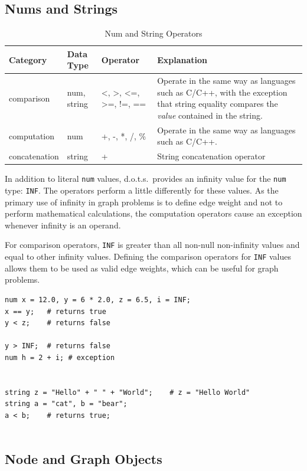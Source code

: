 \documentclass{article}
\newcommand{\pltlang}{d.o.t.s.} %
\newcommand{\code}[1]{\texttt{#1}} %
\begin{document}
\subsection{Nums and Strings}

\begin{table}[H]
\centering
\begin{tabular}{| p{.8in} | p{1in} | p{1.5in} | p{2.5in} | }
\hline
Category & Data Type & Operator & Explanation \\
\hline
comparison & num, string & <, >, <=, >=, !=, == & Operate in the same way as languages such as C/C++, with the exception that string equality compares the \emph{value} contained in the string. \\
\hline
computation & num & +, -, *, /, \% & Operate in the same way as languages such as C/C++. \\
\hline
concatenation & string & + & String concatenation operator \\
\hline
\end{tabular}
\caption{Num and String Operators}
\label{tbl:comp_ops}
\end{table}

In addition to literal \code{num} values, \pltlang\ provides an infinity value for the \code{num} type: \code{INF}. The operators perform a little differently for these values. As the primary use of infinity in graph problems is to define edge weight and not to perform mathematical calculations, the computation operators cause an exception whenever infinity is an operand. 

For comparison operators, \code{INF} is greater than all non-null non-infinity values and equal to other infinity values. Defining the comparison operators for \code{INF} values allows them to be used as valid edge weights, which can be useful for graph problems.


\begin{lstlisting}[language=pltLang, caption=Demonstration of ``num'' and ``string'' types., label=lst:num-str]
num x = 12.0, y = 6 * 2.0, z = 6.5, i = INF;
x == y;   # returns true
y < z;    # returns false

y > INF;  # returns false
num h = 2 + i; # exception


string z = "Hello" + " " + "World";    # z = "Hello World"
string a = "cat", b = "bear";
a < b;    # returns true;


\end{lstlisting}

\subsection{Node and Graph Objects}
\end{document}
